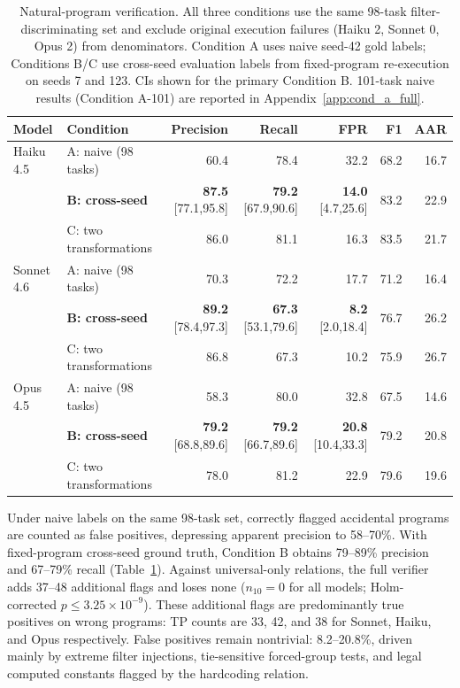 \documentclass{article}
\newenvironment{adjustbox}[1]{}{}
\newcommand{\multirow}[3]{#3}
\newcommand{\tabref}[1]{Table~\ref{#1}}
\begin{document}
\begin{table}[t]
\centering
\caption{Natural-program verification. All three conditions use the same 98-task filter-discriminating set and exclude original execution failures (Haiku 2, Sonnet 0, Opus 2) from denominators. Condition A uses naive seed-42 gold labels; Conditions B/C use cross-seed evaluation labels from fixed-program re-execution on seeds 7 and 123. CIs shown for the primary Condition B. 101-task naive results (Condition A-101) are reported in Appendix~\ref{app:cond_a_full}.}
\label{tab:natural}
\small
\begin{adjustbox}{max width=\textwidth}
\begin{tabular}{llrrrrr}
\toprule
Model & Condition & Precision & Recall & FPR & F1 & AAR \\
\midrule
\multirow{3}{*}{Haiku 4.5}
 & A: naive (98 tasks) & 60.4 & 78.4 & 32.2 & 68.2 & 16.7 \\
 & \textbf{B: cross-seed} & \textbf{87.5} [77.1,95.8] & \textbf{79.2} [67.9,90.6] & \textbf{14.0} [4.7,25.6] & 83.2 & 22.9 \\
 & C: two transformations & 86.0 & 81.1 & 16.3 & 83.5 & 21.7 \\
\midrule
\multirow{3}{*}{Sonnet 4.6}
 & A: naive (98 tasks) & 70.3 & 72.2 & 17.7 & 71.2 & 16.4 \\
 & \textbf{B: cross-seed} & \textbf{89.2} [78.4,97.3] & \textbf{67.3} [53.1,79.6] & \textbf{8.2} [2.0,18.4] & 76.7 & 26.2 \\
 & C: two transformations & 86.8 & 67.3 & 10.2 & 75.9 & 26.7 \\
\midrule
\multirow{3}{*}{Opus 4.5}
 & A: naive (98 tasks) & 58.3 & 80.0 & 32.8 & 67.5 & 14.6 \\
 & \textbf{B: cross-seed} & \textbf{79.2} [68.8,89.6] & \textbf{79.2} [66.7,89.6] & \textbf{20.8} [10.4,33.3] & 79.2 & 20.8 \\
 & C: two transformations & 78.0 & 81.2 & 22.9 & 79.6 & 19.6 \\
\bottomrule
\end{tabular}
\end{adjustbox}
\end{table}

Under naive labels on the same 98-task set, correctly flagged accidental programs are counted as false positives, depressing apparent precision to 58--70\%. With fixed-program cross-seed ground truth, Condition B obtains 79--89\% precision and 67--79\% recall (\tabref{tab:natural}). Against universal-only relations, the full verifier adds 37--48 additional flags and loses none ($n_{10}=0$ for all models; Holm-corrected $p\leq3.25\times10^{-9}$). These additional flags are predominantly true positives on wrong programs: TP counts are 33, 42, and 38 for Sonnet, Haiku, and Opus respectively. False positives remain nontrivial: 8.2--20.8\%, driven mainly by extreme filter injections, tie-sensitive forced-group tests, and legal computed constants flagged by the hardcoding relation.
\end{document}
